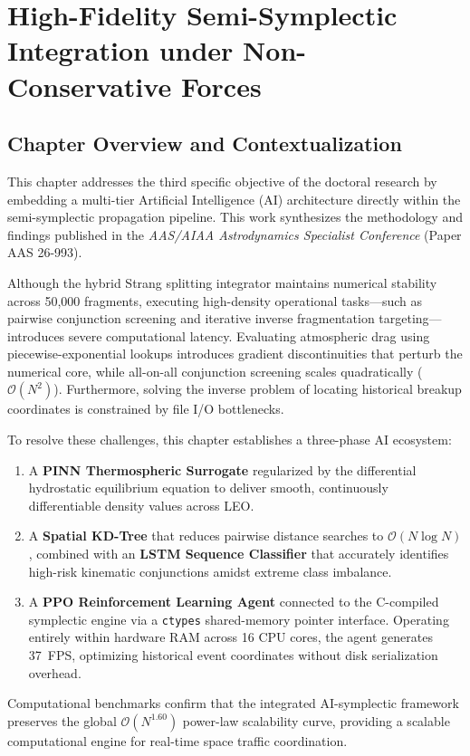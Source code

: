 \chapter{High-Fidelity Semi-Symplectic Integration under Non-Conservative Forces}
\label{ch:paper2}

\section*{Chapter Overview and Contextualization}
This chapter addresses the third specific objective of the doctoral research by embedding a multi-tier Artificial Intelligence (AI) architecture directly within the semi-symplectic propagation pipeline. This work synthesizes the methodology and findings published in the \textit{AAS/AIAA Astrodynamics Specialist Conference} (Paper AAS 26-993).

Although the hybrid Strang splitting integrator maintains numerical stability across 50,000 fragments, executing high-density operational tasks---such as pairwise conjunction screening and iterative inverse fragmentation targeting---introduces severe computational latency. Evaluating atmospheric drag using piecewise-exponential lookups introduces gradient discontinuities that perturb the numerical core, while all-on-all conjunction screening scales quadratically ($\mathcal{O}(N^2)$). Furthermore, solving the inverse problem of locating historical breakup coordinates is constrained by file I/O bottlenecks.

To resolve these challenges, this chapter establishes a three-phase AI ecosystem:
\begin{enumerate}
    \item A \textbf{PINN Thermospheric Surrogate} regularized by the differential hydrostatic equilibrium equation to deliver smooth, continuously differentiable density values across LEO.
    \item A \textbf{Spatial KD-Tree} that reduces pairwise distance searches to $\mathcal{O}(N \log N)$, combined with an \textbf{LSTM Sequence Classifier} that accurately identifies high-risk kinematic conjunctions amidst extreme class imbalance.
    \item A \textbf{PPO Reinforcement Learning Agent} connected to the C-compiled symplectic engine via a \texttt{ctypes} shared-memory pointer interface. Operating entirely within hardware RAM across 16 CPU cores, the agent generates 37~FPS, optimizing historical event coordinates without disk serialization overhead.
\end{enumerate}
Computational benchmarks confirm that the integrated AI-symplectic framework preserves the global $\mathcal{O}(N^{1.60})$ power-law scalability curve, providing a scalable computational engine for real-time space traffic coordination.

